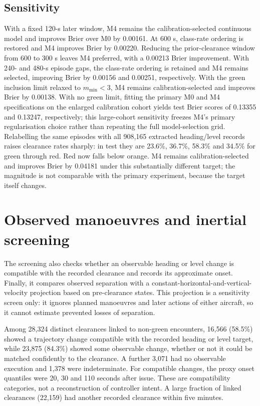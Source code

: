 \documentclass[aerospace,article,submit,moreauthors]{Definitions/mdpi}
\newcommand{\mmin}{m_{\min}}
\begin{document}
\subsection{Sensitivity}
With a fixed 120-s later window, M4 remains the calibration-selected continuous model and improves Brier over M0 by 0.00161. At 600 s, class-rate ordering is restored and M4 improves Brier by 0.00220. Reducing the prior-clearance window from 600 to 300 s leaves M4 preferred, with a 0.00213 Brier improvement. With 240- and 480-s episode gaps, the class-rate ordering is retained and M4 remains selected, improving Brier by 0.00156 and 0.00251, respectively. With the green inclusion limit relaxed to $\mmin<3$, M4 remains calibration-selected and improves Brier by 0.00138. With no green limit, fitting the primary M0 and M4 specifications on the enlarged calibration cohort yields test Brier scores of 0.13355 and 0.13247, respectively; this large-cohort sensitivity freezes M4's primary regularisation choice rather than repeating the full model-selection grid. Relabelling the same episodes with all 908,165 extracted heading/level records raises clearance rates sharply: in test they are 23.6\%, 36.7\%, 58.3\% and 34.5\% for green through red. Red now falls below orange. M4 remains calibration-selected and improves Brier by 0.04181 under this substantially different target; the magnitude is not comparable with the primary experiment, because the target itself changes.

\section{Observed manoeuvres and inertial screening}\label{app:manoeuvres}
The screening also checks whether an observable heading or level change is compatible with the recorded clearance and records its approximate onset. Finally, it compares observed separation with a constant-horizontal-and-vertical-velocity projection based on pre-clearance states. This projection is a sensitivity screen only: it ignores planned manoeuvres and later actions of either aircraft, so it cannot estimate prevented losses of separation.

Among 28,324 distinct clearances linked to non-green encounters, 16,566 (58.5\%) showed a trajectory change compatible with the recorded heading or level target, while 23,875 (84.3\%) showed some observable change, whether or not it could be matched confidently to the clearance. A further 3,071 had no observable execution and 1,378 were indeterminate. For compatible changes, the proxy onset quantiles were 20, 30 and 110 seconds after issue. These are compatibility categories, not a reconstruction of controller intent. A large fraction of linked clearances (22,159) had another recorded clearance within five minutes.
\end{document}
